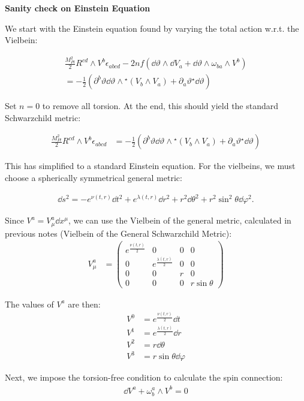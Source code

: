 \documentclass[12pt]{article}
\newcommand{\hodge}{{^\star}}
\begin{document}
\begin{center}
  \Large\textbf{Sanity check on Einstein Equation} \\
  \large{}
\end{center}

We start with the Einstein equation found by varying the total action w.r.t. the Vielbein: 

\begin{align}
  \frac{M_{Pl}^2}{2}R^{cd} \wedge V^b \epsilon_{abcd} - 2\mathit{nf}(\dd\vartheta \wedge \dd V_a + \dd\vartheta \wedge \omega_{ba} \wedge V^b) \nonumber \\ = - \frac{1}{2}(\partial^b\vartheta \dd\vartheta \wedge \hodge(V_b \wedge V_a) + \partial_a\vartheta \hodge\dd\vartheta)
\end{align}

Set $n=0$ to remove all torsion. At the end, this should yield the standard Schwarzchild metric:

\begin{align}
  \frac{M_{Pl}^2}{2}R^{cd} \wedge V^b \epsilon_{abcd} &= - \frac{1}{2}(\partial^b\vartheta \dd\vartheta \wedge \hodge(V_b \wedge V_a) + \partial_a\vartheta \hodge\dd\vartheta)
\end{align}

This has simplified to a standard Einstein equation. For the vielbeins, we must choose a spherically symmetrical general metric:

\begin{align}
  \dd s^2 = -e^{\nu(t,r)}\dd{t^2} + e^{\lambda(t,r)}\dd{r^2} + r^2\dd{\theta^2} + r^2\sin^2{\theta}\dd{\varphi^2}.
\end{align}

Since $V^a = V^a_\mu \dd x^\mu$, we can use the Vielbein of the general metric, calculated in previous notes (Vielbein of the General Schwarzchild Metric):
\begin{align}
  V^a_\mu &= \begin{pmatrix}
    e^{\frac{\nu(t,r)}{2}} & 0 & 0 & 0 \\
    0 & e^{\frac{\lambda(t,r)}{2}} & 0 & 0 \\
    0 & 0 & r & 0 \\
    0 & 0 & 0 & r\sin{\theta}
  \end{pmatrix}
\end{align}

The values of $V^a$ are then:
\begin{align*}
  V^0 &= e^{\frac{\nu(t,r)}{2}} \dd{t} \\
  V^1 &= e^{\frac{\lambda(t,r)}{2}} \dd{r} \\
  V^2 &= r \dd{\theta} \\
  V^3 &= r\sin{\theta} \dd{\varphi}
\end{align*}

Next, we impose the torsion-free condition to calculate the spin connection:
\begin{align}
  \dd{V^a} + \omega^a_b \wedge V^b = 0
\end{align}
\end{document}
